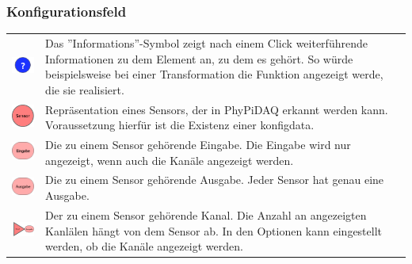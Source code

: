 \documentclass[parskip=full]{scrartcl}
\begin{document}
\subsubsection{Konfigurationsfeld}

\begin{tabular}[t]{p{1cm} p{10cm}}
	\vspace{0cm}\includegraphics[width = 1 cm]{Grafik/Information.png} & Das ''Informations''-Symbol zeigt nach einem Click weiterführende Informationen zu dem Element an, zu dem es gehört. So würde beispielsweise bei einer Transformation die Funktion angezeigt werde, die sie realisiert.\newline\\\cline{1-2}
	\vspace{0cm}\includegraphics[width = 1 cm]{Grafik/Sensorelement.png} & Repräsentation eines Sensors, der in PhyPiDAQ erkannt werden kann. Voraussetzung hierfür ist die Existenz einer \gls{konfigdata}.\newline\\
	\vspace{0cm}\includegraphics[width = 1 cm]{Grafik/Eingabe-Sensor.png} & Die zu einem Sensor gehörende Eingabe. Die Eingabe wird nur angezeigt, wenn auch die Kanäle angezeigt werden.\newline\\
	\vspace{0cm}\includegraphics[width = 1 cm]{Grafik/Ausgabe-Sensor.png} & Die zu einem Sensor gehörende Ausgabe. Jeder Sensor hat genau eine Ausgabe.\newline\\
	\vspace{0cm}\includegraphics[width = 1 cm]{Grafik/Kanal.png} & Der zu einem Sensor gehörende Kanal. Die Anzahl an angezeigten Kanlälen hängt von dem Sensor ab. In den Optionen kann eingestellt werden, ob die Kanäle angezeigt werden.\newline\\\cline{1-2}

\end{tabular}
\end{document}
